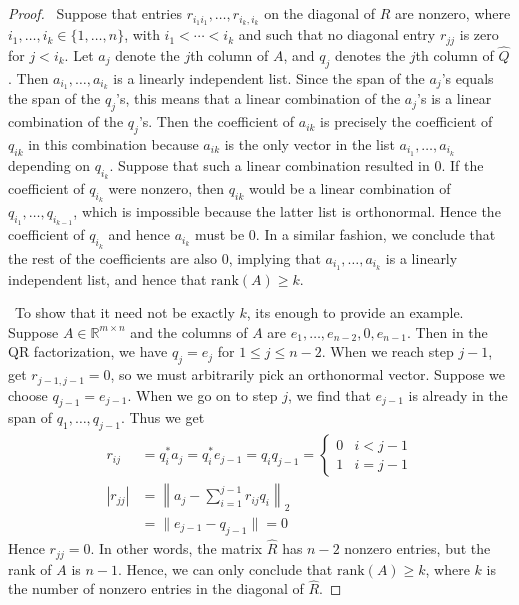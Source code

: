 \documentclass[12pt]{article}
\newenvironment{sol}[1][Solution]{\begin{trivlist}
		\item[\hskip \labelsep {\bfseries #1:}]}{\end{trivlist}}
\begin{document}
\begin{sol}
\begin{enumerate}[label=(\alph*)]
\begin{proof}
			\
			Suppose that entries $r_{i_1i_1},\ldots,r_{i_k,i_k}$ on the diagonal of $\hat{R}$ are
			nonzero, where $i_1,\ldots,i_k\in\{1,\ldots,n\}$, with $i_1<\cdots<i_k$ and such that
			no diagonal entry $r_{jj}$ is zero for $j<i_k$. Let
			$a_j$ denote the $j$th column of $A$, and $q_j$ denotes the $j$th column of $\hat{Q}$.
			Then $a_{i_1},\ldots,a_{i_k}$ is a linearly independent list. Since the span of the
			$a_j$'s equals the span of the $q_j$'s, this means that a linear combination of
			the $a_j$'s is a linear combination of the $q_j$'s. Then the coefficient of $a_{ik}$
			is precisely the coefficient of $q_{ik}$ in this combination because $a_{ik}$ is the
			only vector in the list $a_{i_1},\ldots,a_{i_k}$ depending on $q_{i_k}$. Suppose that
			such a linear combination resulted in 0. If the coefficient of $q_{i_k}$ were nonzero,
			then $q_{ik}$ would be a linear combination of $q_{i_1},\ldots,q_{i_{k-1}}$, which
			is impossible because the latter list is orthonormal. Hence the coefficient of $q_{i_k}$
			and hence $a_{i_k}$ must be 0. In a similar fashion, we conclude that the rest of
			the coefficients are also 0, implying that $a_{i_1},\ldots,a_{i_k}$ is a linearly
			independent list, and hence that $\text{rank}(A)\geq k$.
			
			\
			To show that it need not be exactly $k$, its enough to provide an example. Suppose
			$A\in\mathbb{R}^{m\times n}$ and the columns of $A$ are $e_1,\ldots,e_{n-2},0,e_{n-1}$.
			Then in the QR factorization, we have $q_j=e_j$ for $1\leq j\leq n-2$. When we
			reach step $j-1$, get $r_{j-1,j-1}=0$, so we must arbitrarily pick an orthonormal
			vector. Suppose we choose $q_{j-1}=e_{j-1}$. When we go on to step $j$, we find that
			$e_{j-1}$ is already in the span of $q_1,\ldots,q_{j-1}$. Thus we get
			\begin{align*}
			r_{ij}&=q_i^*a_{j}=q_i^*e_{j-1}=q_iq_{j-1}=\begin{cases}
				0 & i < {j-1}\\
				1 & i = j-1
			\end{cases}\\
			|r_{jj}|&=\left\lVert a_j-\sum_{i=1}^{j-1}r_{ij}q_i\right\rVert_2\\
			&=\lVert e_{j-1}-q_{j-1}\rVert=0
			\end{align*}
			Hence $r_{jj}=0$. In other words, the matrix $\hat{R}$ has $n-2$ nonzero entries, but
			the rank of $A$ is $n-1$. Hence, we can only conclude that $\text{rank}(A)\geq k$, where
			$k$ is the number of nonzero entries in the diagonal of $\hat{R}$.
		\end{proof}
	\end{enumerate}
\end{sol}
\end{document}
